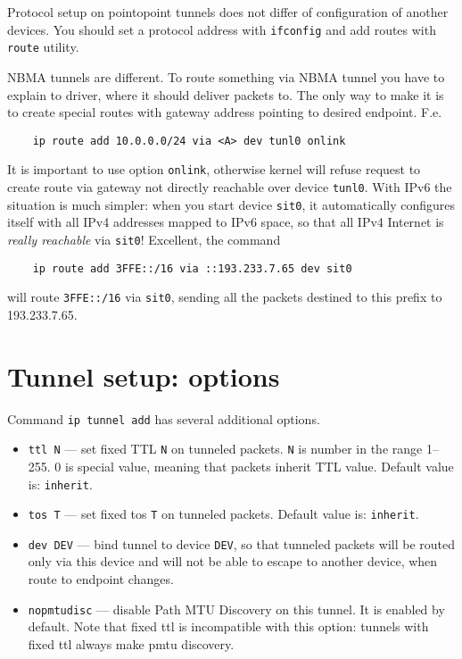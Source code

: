 Protocol setup on pointopoint tunnels does not differ of configuration
of another devices. You should set a protocol address with \verb|ifconfig|
and add routes with \verb|route| utility.

NBMA tunnels are different. To route something via NBMA tunnel
you have to explain to driver, where it should deliver packets to.
The only way to make it is to create special routes with gateway
address pointing to desired endpoint. F.e.\
\begin{verbatim}
    ip route add 10.0.0.0/24 via <A> dev tunl0 onlink
\end{verbatim}
It is important to use option \verb|onlink|, otherwise
kernel will refuse request to create route via gateway not directly
reachable over device \verb|tunl0|. With IPv6 the situation is much simpler:
when you start device \verb|sit0|, it automatically configures itself
with all IPv4 addresses mapped to IPv6 space, so that all IPv4
Internet is {\em really reachable} via \verb|sit0|! Excellent, the command
\begin{verbatim}
    ip route add 3FFE::/16 via ::193.233.7.65 dev sit0
\end{verbatim}
will route \verb|3FFE::/16| via \verb|sit0|, sending all the packets
destined to this prefix to 193.233.7.65.

\section{Tunnel setup: options}

Command \verb|ip tunnel add| has several additional options.
\begin{itemize}

\item \verb|ttl N| --- set fixed TTL \verb|N| on tunneled packets.
	\verb|N| is number in the range 1--255. 0 is special value,
	meaning that packets inherit TTL value.
		Default value is: \verb|inherit|.

\item \verb|tos T| --- set fixed tos \verb|T| on tunneled packets.
		Default value is: \verb|inherit|.

\item \verb|dev DEV| --- bind tunnel to device \verb|DEV|, so that
	tunneled packets will be routed only via this device and will
	not be able to escape to another device, when route to endpoint changes.

\item \verb|nopmtudisc| --- disable Path MTU Discovery on this tunnel.
	It is enabled by default. Note that fixed ttl is incompatible
	with this option: tunnels with fixed ttl always make pmtu discovery.

\end{itemize}

